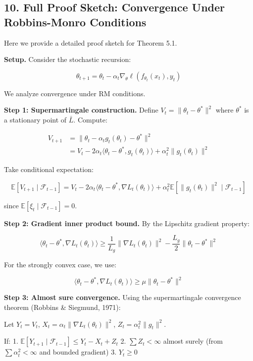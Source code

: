 \documentclass[
  12pt,
]{article}
\begin{document}
\subsection{10. Full Proof Sketch: Convergence Under Robbins-Monro
Conditions}\label{full-proof-sketch-convergence-under-robbins-monro-conditions}

Here we provide a detailed proof sketch for Theorem 5.1.

\textbf{Setup.} Consider the stochastic recursion:

\[
\theta_{t+1} = \theta_t - \alpha_t \nabla_\theta \ell(f_{\theta_t}(x_t), y_t)
\]

We analyze convergence under RM conditions.

\textbf{Step 1: Supermartingale construction.} Define
\(V_t = \|\theta_t - \theta^*\|^2\) where \(\theta^*\) is a stationary
point of \(\bar{L}\). Compute:

\[
\begin{aligned}
V_{t+1} &= \|\theta_t - \alpha_t g_t(\theta_t) - \theta^*\|^2 \\
&= V_t - 2\alpha_t \langle \theta_t - \theta^*, g_t(\theta_t) \rangle + \alpha_t^2 \|g_t(\theta_t)\|^2
\end{aligned}
\]

Take conditional expectation:

\[
\mathbb{E}[V_{t+1} \mid \mathcal{F}_{t-1}] = V_t - 2\alpha_t \langle \theta_t - \theta^*, \nabla L_t(\theta_t) \rangle + \alpha_t^2 \mathbb{E}[\|g_t(\theta_t)\|^2 \mid \mathcal{F}_{t-1}]
\]

since \(\mathbb{E}[\xi_t \mid \mathcal{F}_{t-1}] = 0\).

\textbf{Step 2: Gradient inner product bound.} By the Lipschitz gradient
property:

\[
\langle \theta_t - \theta^*, \nabla L_t(\theta_t) \rangle \geq \frac{1}{L_g} \|\nabla L_t(\theta_t)\|^2 - \frac{L_g}{2} \|\theta_t - \theta^*\|^2
\]

For the strongly convex case, we use:

\[
\langle \theta_t - \theta^*, \nabla L_t(\theta_t) \rangle \geq \mu \|\theta_t - \theta^*\|^2
\]

\textbf{Step 3: Almost sure convergence.} Using the supermartingale
convergence theorem (Robbins \& Siegmund, 1971):

Let \(Y_t = V_t\), \(X_t = \alpha_t \|\nabla L_t(\theta_t)\|^2\),
\(Z_t = \alpha_t^2 \|g_t\|^2\).

If: 1.
\(\mathbb{E}[Y_{t+1} \mid \mathcal{F}_{t-1}] \leq Y_t - X_t + Z_t\) 2.
\(\sum Z_t < \infty\) almost surely (from \(\sum \alpha_t^2 < \infty\)
and bounded gradient) 3. \(Y_t \geq 0\)
\end{document}
